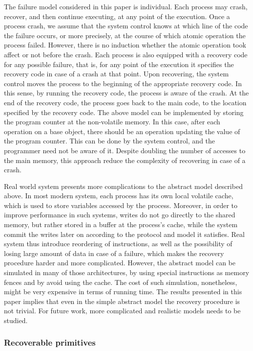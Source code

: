 \documentclass{article}
\begin{document}
The failure model considered in this paper is individual. Each process may crash, recover, and then continue executing, at any point of the execution. Once a process crash, we assume that the system control knows at which line of the code the failure occurs, or more precisely, at the course of which atomic operation the process failed. However, there is no induction whether the atomic operation took affect or not before the crash. Each process is also equipped with a recovery code for any possible failure, that is, for any point of the execution it specifies the recovery code in case of a crash at that point. Upon recovering, the system control moves the process to the beginning of the appropriate recovery code. In this sense, by running the recovery code, the process is aware of the crash. At the end of the recovery code, the process goes back to the main code, to the location specified by the recovery code. The above model can be implemented by storing the program counter at the non-volatile memory. In this case, after each operation on a base object, there should be an operation updating the value of the program counter. This can be done by the system control, and the programmer need not be aware of it. Despite doubling the number of accesses to the main memory, this approach reduce the complexity of recovering in case of a crash.

Real world system presents more complications to the abstract model described above. In most modern system, each process has its own local volatile cache, which is used to store variables accessed by the process. Moreover, in order to improve performance in such systems, writes do not go directly to the shared memory, but rather stored in a buffer at the process's cache, while the system commit the writes later on according to the protocol and model it satisfies. Real system thus introduce reordering of instructions, as well as the possibility of losing large amount of data in case of a failure, which makes the recovery procedure harder and more complicated. However, the abstract model can be simulated in many of those architectures, by using special instructions as memory fences and by avoid using the cache. The cost of such simulation, nonetheless, might be very expensive in terms of running time.
The results presented in this paper implies that even in the simple abstract model the recovery procedure is not trivial. For future work, more complicated and realistic models needs to be studied.

\subsubsection*{Recoverable primitives}
\end{document}

